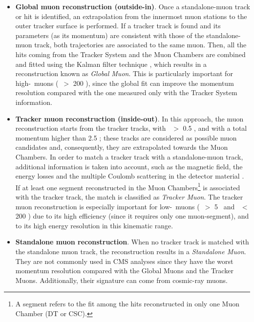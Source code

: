 \begin{itemize}
 \item \textbf{Global muon reconstruction (outside-in)}. Once a standalone-muon 
 track or hit is identified,  an extrapolation from the innermost muon stations to 
 the outer tracker surface is performed. If a tracker track is found and its 
 parameters (as its momentum) are consistent with those of the standalone-muon track, both trajectories
 are associated to the same muon. Then, all the hits coming from the Tracker System
 and the Muon Chambers are combined and fitted using the Kalman 
 filter technique \cite{KalmanAlgorithm}, which results in a reconstruction known as \textit{Global Muon}.
 This is particularly important for high-\pt~muons (\pt~$>$ 200 \GeV), since 
 the global fit can improve the momentum resolution compared with the one measured only with the 
 Tracker System information. 
 \item \textbf{Tracker muon reconstruction (inside-out)}. In this approach, the muon reconstruction 
 starts from the tracker tracks, with \pt~$>$ 0.5 \GeV, and 
 with a total momentum higher than 2.5 \GeV; these tracks are considered as 
 possible muon candidates and, consequently, they are extrapolated towards 
 the Muon Chambers. In order to match a tracker track with a standalone-muon 
 track, additional information is taken into account, such as the magnetic field,
 the energy losses and the multiple Coulomb scattering in the 
 detector material \cite{MuonID7TeV}. If at least one segment reconstructed in the Muon Chambers\footnote{
 A segment refers to the fit among the hits reconstructed in only one Muon Chamber (DT or CSC).} 
 is associated with the tracker track, the match is 
 classified as \textit{Tracker Muon}. The tracker muon reconstruction is especially
 important for low-\pt~muons (\pt~$>$ 5 \GeV~and \pt~$<$ 200 \GeV) due 
 to its high efficiency (since it requires only one muon-segment), 
 and to its high energy resolution in this kinematic range. 
 \item \textbf{Standalone muon reconstruction}. When no tracker track is matched with the standalone muon track,
 the reconstruction results in a \textit{Standalone Muon}. They are not commonly used in CMS analyses since they 
 have the worst momentum resolution compared with the Global Muons and the Tracker Muons. Additionally, their 
 signature can come from cosmic-ray muons.
\end{itemize}

